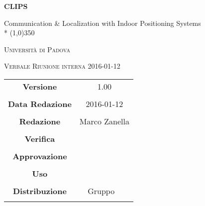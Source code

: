 \documentclass[a4paper,12pt]{article}
\begin{document}
\begin{titlepage}
	\centering
	{\huge\bfseries CLIPS\par}
	Communication \& Localization with Indoor Positioning Systems \\*
	\line(1,0){350} \\
	{\scshape\LARGE Università di Padova \par}
	\vspace{1cm}
	{\scshape\Large Verbale Riunione interna 2016-01-12 \par}
	\logo
	\newpage
	\begin{tabular}{c|c}
		{\hfill \textbf{Versione}} 			& 1.00				\\ \\
		{\hfill\textbf{Data Redazione}} 		& 2016-01-12  		\\ \\
		{\hfill\textbf{Redazione}} 			& Marco Zanella		\\ \\
		{\hfill\textbf{Verifica}} 				&  					\\ \\
		{\hfill\textbf{Approvazione}} 		&  					\\ \\
		{\hfill\textbf{Uso}} 					& 					\\ \\
		{\hfill\textbf{Distribuzione}} 			& Gruppo \leaf\		\\ \\
	\end{tabular}
\end{titlepage}
	
	\newpage

	
	\label{LastFrontPage}
	

	\newpage
	
	\pagestyle{mymain}
	
	
		

	
		
	
	
		
	
	
		
				
	\label{LastPage}
\end{document}
